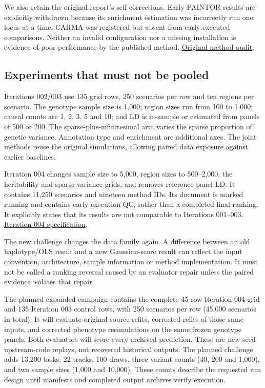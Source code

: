 \documentclass[
  british,
  10pt,
]{article}
\begin{document}
We also retain the original report's self-corrections. Early PAINTOR
results are explicitly withdrawn because its enrichment estimation was
incorrectly run one locus at a time. CARMA was registered but absent
from early executed comparisons. Neither an invalid configuration nor a
missing installation is evidence of poor performance by the published
method.
\href{https://github.com/lucassiu14/fine-mapping-benchmark/blob/f053fdf318a3abe2c44eeb0ac3f3c99a03979b81/docs/autoresearch/iteration-003.md\#L276-L374}{Original
method audit}.

\subsection{Experiments that must not be
pooled}\label{experiments-that-must-not-be-pooled}

Iterations 002/003 use 135 grid rows, 250 scenarios per row and ten
regions per scenario. The genotype sample size is 1,000; region sizes
run from 100 to 1,000; causal counts are 1, 2, 3, 5 and 10; and LD is
in-sample or estimated from panels of 500 or 200. The
sparse-plus-infinitesimal arm varies the sparse proportion of genetic
variance. Annotation type and enrichment are additional axes. The joint
methods reuse the original simulations, allowing paired data exposure
against earlier baselines.

Iteration 004 changes sample size to 5,000, region sizes to 500--2,000,
the heritability and sparse-variance grids, and removes reference-panel
LD. It contains 11,250 scenarios and nineteen method IDs. Its document
is marked running and contains early execution QC, rather than a
completed final ranking. It explicitly states that its results are not
comparable to Iterations 001--003.
\href{https://github.com/lucassiu14/fine-mapping-benchmark/blob/f053fdf318a3abe2c44eeb0ac3f3c99a03979b81/docs/autoresearch/iteration-004.md}{Iteration
004 specification}.

The new challenge changes the data family again. A difference between an
old haplotype/OLS result and a new Gaussian-score result can reflect the
input convention, architecture, sample information or method
implementation. It must not be called a ranking reversal caused by an
evaluator repair unless the paired evidence isolates that repair.

The planned expanded campaign contains the complete 45-row Iteration 004
grid and 135 Iteration 003 control rows, with 250 scenarios per row
(45,000 scenarios in total). It will evaluate original-source refits,
corrected refits of those same inputs, and corrected phenotype
resimulations on the same frozen genotype panels. Both evaluators will
score every archived prediction. These are new-seed upstream-code
replays, not recovered historical outputs. The planned challenge adds
13,200 tasks: 22 tracks, 100 draws, three variant counts (40, 200 and
1,000), and two sample sizes (1,000 and 10,000). These counts describe
the requested run design until manifests and completed output archives
verify execution.
\end{document}
